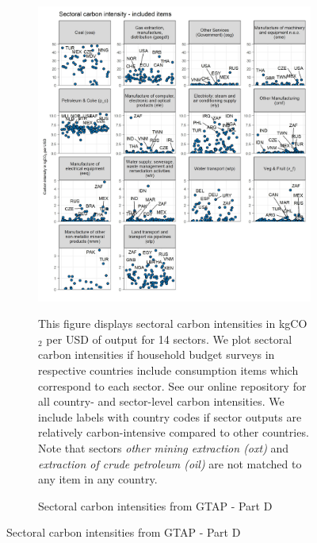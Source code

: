 \begin{figure}[ht!]\ContinuedFloat
\begin{subfigure}[b]{\textwidth}
  \centering
  \caption{Sectoral carbon intensities from GTAP - Part D} \label{fig:B4}  \includegraphics{Analysis_Carbon_Intensities_GTAP/Figure_2.1.1_D_2017}
  \begin{subcaption2}
    This figure displays sectoral carbon intensities in kgCO$_{2}$ per USD of output for 14 sectors. We plot sectoral carbon intensities if household budget surveys in respective countries include consumption items which correspond to each sector. See our online repository for all country- and sector-level carbon intensities. We include labels with country codes if sector outputs are relatively carbon-intensive compared to other countries. Note that sectors \textit{other mining extraction (oxt)} and \textit{extraction of crude petroleum (oil)} are not matched to any item in any country.
  \end{subcaption2}
\end{subfigure}
\end{figure}

\clearpage
